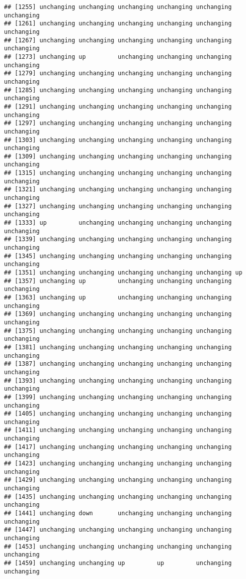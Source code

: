\documentclass[]{article}
\begin{document}
\begin{verbatim}
## [1255] unchanging unchanging unchanging unchanging unchanging unchanging
## [1261] unchanging unchanging unchanging unchanging unchanging unchanging
## [1267] unchanging unchanging unchanging unchanging unchanging unchanging
## [1273] unchanging up         unchanging unchanging unchanging unchanging
## [1279] unchanging unchanging unchanging unchanging unchanging unchanging
## [1285] unchanging unchanging unchanging unchanging unchanging unchanging
## [1291] unchanging unchanging unchanging unchanging unchanging unchanging
## [1297] unchanging unchanging unchanging unchanging unchanging unchanging
## [1303] unchanging unchanging unchanging unchanging unchanging unchanging
## [1309] unchanging unchanging unchanging unchanging unchanging unchanging
## [1315] unchanging unchanging unchanging unchanging unchanging unchanging
## [1321] unchanging unchanging unchanging unchanging unchanging unchanging
## [1327] unchanging unchanging unchanging unchanging unchanging unchanging
## [1333] up         unchanging unchanging unchanging unchanging unchanging
## [1339] unchanging unchanging unchanging unchanging unchanging unchanging
## [1345] unchanging unchanging unchanging unchanging unchanging unchanging
## [1351] unchanging unchanging unchanging unchanging unchanging up        
## [1357] unchanging up         unchanging unchanging unchanging unchanging
## [1363] unchanging up         unchanging unchanging unchanging unchanging
## [1369] unchanging unchanging unchanging unchanging unchanging unchanging
## [1375] unchanging unchanging unchanging unchanging unchanging unchanging
## [1381] unchanging unchanging unchanging unchanging unchanging unchanging
## [1387] unchanging unchanging unchanging unchanging unchanging unchanging
## [1393] unchanging unchanging unchanging unchanging unchanging unchanging
## [1399] unchanging unchanging unchanging unchanging unchanging unchanging
## [1405] unchanging unchanging unchanging unchanging unchanging unchanging
## [1411] unchanging unchanging unchanging unchanging unchanging unchanging
## [1417] unchanging unchanging unchanging unchanging unchanging unchanging
## [1423] unchanging unchanging unchanging unchanging unchanging unchanging
## [1429] unchanging unchanging unchanging unchanging unchanging unchanging
## [1435] unchanging unchanging unchanging unchanging unchanging unchanging
## [1441] unchanging down       unchanging unchanging unchanging unchanging
## [1447] unchanging unchanging unchanging unchanging unchanging unchanging
## [1453] unchanging unchanging unchanging unchanging unchanging unchanging
## [1459] unchanging unchanging up         up         unchanging unchanging

\end{verbatim}
\end{document}
